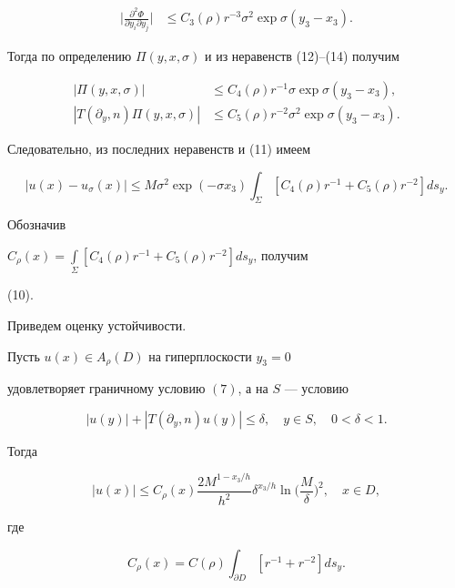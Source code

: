 \begin{pf}
\begin{align}
% 


\bigg|\frac{\partial^2\Phi}{\partial y_i\partial y_j}\bigg|&\le 


C_3(\rho)r^{-3}\sigma^2\exp\sigma(y_3-x_3). 


\end{align} 


Тогда по определению $\Pi(y,x,\sigma)$ и из неравенств (12)--(14) получим 


\begin{align} 


|\Pi(y,x,\sigma)|&\le C_4(\rho)r^{-1}\sigma\exp\sigma(y_3-x_3),\\ 


% 


|T(\partial_y,n)\Pi(y,x,\sigma)|&\le C_5(\rho)r^{-2}\sigma^2 


\exp\sigma(y_3-x_3). 


\end{align} 


Следовательно, из последних неравенств и (11) имеем 


$$ 


|u(x)-u_\sigma(x)|\le M\sigma^2\exp(-\sigma x_3) 


\int_\Sigma[C_4(\rho)r^{-1}+C_5(\rho)r^{-2}]ds_y. 


$$ 


Обозначив 


$C_\rho(x)=\int\limits_\Sigma[C_4(\rho)r^{-1}+C_5(\rho)r^{-2}]ds_y$, получим 


(10). 


\end{pf} 


 


 


Приведем оценку устойчивости. 


 


 


\begin{thm} 


Пусть $u(x)\in A_\rho(D)$ на гиперплоскости $y_3=0$ 


удовлетворяет граничному условию $(7)$, а на $S$ --- условию 


$$ 


|u(y)|+|T(\partial_y,n)u(y)|\le\delta,\quad y\in S,\quad 0<\delta<1. 


$$ 


Тогда 


$$ 


|u(x)|\le C_\rho(x)\frac{2M^{1-x_3/h}}{h^2}\delta^{x_3/h}\ln\bigg( 


\frac{M}{\delta}\bigg)^2,\quad x\in D, 


$$ 


где 


$$ 


C_\rho(x)=C(\rho)\int_{\partial D}[r^{-1}+r^{-2}]ds_y. 


$$ 


\end{thm} 


